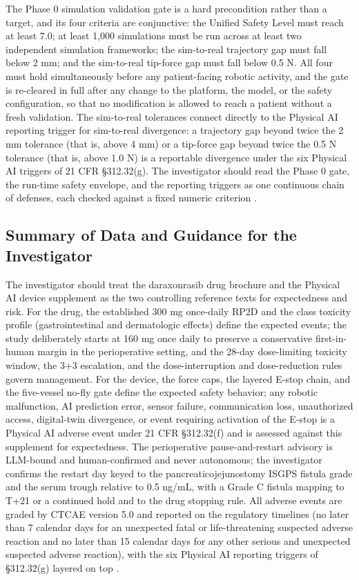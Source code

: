 The Phase 0 simulation validation gate is a hard precondition rather than a target,
and its four criteria are conjunctive: the Unified Safety Level must reach at least
7.0; at least 1,000 simulations must be run across at least two independent
simulation frameworks; the sim-to-real trajectory gap must fall below 2 mm; and the
sim-to-real tip-force gap must fall below 0.5 N. All four must hold simultaneously
before any patient-facing robotic activity, and the gate is re-cleared in full after
any change to the platform, the model, or the safety configuration, so that no
modification is allowed to reach a patient without a fresh validation. The
sim-to-real tolerances connect directly to the Physical AI reporting trigger for
sim-to-real divergence: a trajectory gap beyond twice the 2 mm tolerance (that is,
above 4 mm) or a tip-force gap beyond twice the 0.5 N tolerance (that is, above
1.0 N) is a reportable divergence under the six Physical AI triggers of 21 CFR
\S 312.32(g). The investigator should read the Phase 0 gate, the run-time safety
envelope, and the reporting triggers as one continuous chain of defenses, each
checked against a fixed numeric criterion \cite{congress9510,clintrustpai}.

\subsection*{Summary of Data and Guidance for the Investigator}

The investigator should treat the daraxonrasib drug brochure and the Physical AI
device supplement as the two controlling reference texts for expectedness and risk.
For the drug, the established 300 mg once-daily RP2D and the class toxicity profile
(gastrointestinal and dermatologic effects) define the expected events; the study
deliberately starts at 160 mg once daily to preserve a conservative first-in-human
margin in the perioperative setting, and the 28-day dose-limiting toxicity window,
the 3+3 escalation, and the dose-interruption and dose-reduction rules govern
management. For the device, the force caps, the layered E-stop chain, and the
five-vessel no-fly gate define the expected safety behavior; any robotic
malfunction, AI prediction error, sensor failure, communication loss, unauthorized
access, digital-twin divergence, or event requiring activation of the E-stop is a
Physical AI adverse event under 21 CFR \S 312.32(f) and is assessed against this
supplement for expectedness. The perioperative pause-and-restart advisory is
LLM-bound and human-confirmed and never autonomous; the investigator confirms the
restart day keyed to the pancreaticojejunostomy ISGPS fistula grade and the serum
trough relative to 0.5 ng/mL, with a Grade C fistula mapping to T+21 or a continued
hold and to the drug stopping rule. All adverse events are graded by CTCAE version
5.0 and reported on the regulatory timelines (no later than 7 calendar days for an
unexpected fatal or life-threatening suspected adverse reaction and no later than
15 calendar days for any other serious and unexpected suspected adverse reaction),
with the six Physical AI reporting triggers of \S 312.32(g) layered on top
\cite{daraxwhipple,cfr312paiuni,ichpaistduni}.

